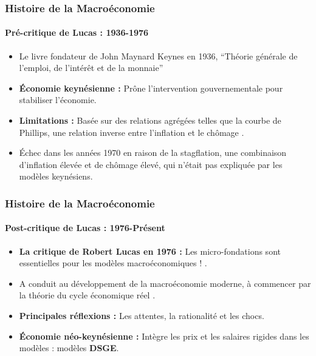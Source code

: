 \documentclass{beamer}
\begin{document}
\begin{frame}
    \frametitle{Histoire de la Macroéconomie}
    \framesubtitle{Pré-critique de Lucas : 1936-1976}
        \begin{itemize}
            \item Le livre fondateur de John Maynard Keynes en 1936, \enquote{Théorie générale de l'emploi, de l'intérêt et de la monnaie}
            \item \textbf{Économie keynésienne :} Prône l'intervention gouvernementale pour stabiliser l'économie.
            \item \textbf{Limitations :} Basée sur des relations agrégées telles que la courbe de Phillips,
            une relation inverse entre l'inflation et le chômage \parencite{Phillips_1958}.
            \item Échec dans les années 1970 en raison de la stagflation, une combinaison d'inflation élevée et de chômage élevé,
            qui n'était pas expliquée par les modèles keynésiens.
        \end{itemize}
    \end{frame}
    \begin{frame}
        \frametitle{Histoire de la Macroéconomie}
        \framesubtitle{Post-critique de Lucas : 1976-Présent}
                \begin{itemize}
                    \item \textbf{La critique de Robert Lucas en 1976 :} Les micro-fondations sont essentielles pour les modèles macroéconomiques ! \parencite{Lucas_1976}.
                    \item A conduit au développement de la macroéconomie moderne, à commencer par la théorie du cycle économique réel \textcite{Kydland_Prescott_1982}.
                    \item \textbf{Principales réflexions :} Les attentes, la rationalité et les chocs.
                    \item \textbf{Économie néo-keynésienne :} Intègre les prix et les salaires rigides dans les modèles : modèles \textbf{DSGE}.
                \end{itemize}
    \end{frame}
                        
\end{document}
